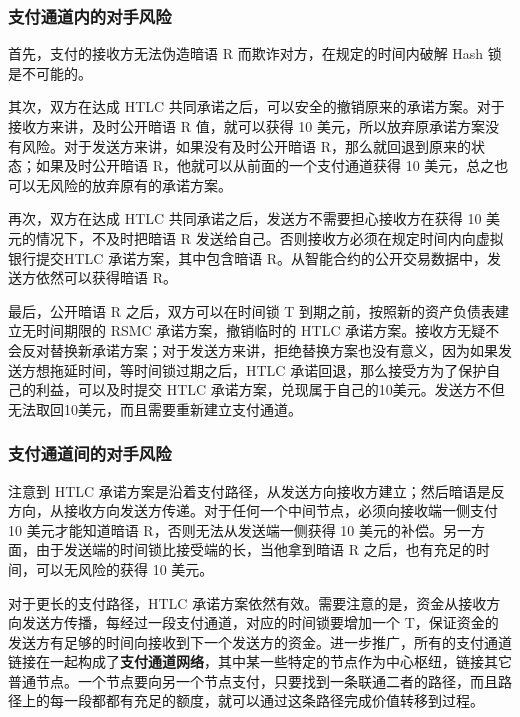 \subsubsection{支付通道内的对手风险}
首先，支付的接收方无法伪造暗语 R 而欺诈对方，在规定的时间内破解 Hash 锁是不可能的。

其次，双方在达成 HTLC 共同承诺之后，可以安全的撤销原来的承诺方案。对于接收方来讲，及时公开暗语 R 值，就可以获得 10 美元，所以放弃原承诺方案没有风险。对于发送方来讲，如果没有及时公开暗语 R，那么就回退到原来的状态；如果及时公开暗语 R，他就可以从前面的一个支付通道获得 10 美元，总之也可以无风险的放弃原有的承诺方案。

再次，双方在达成 HTLC 共同承诺之后，发送方不需要担心接收方在获得 10 美元的情况下，不及时把暗语 R 发送给自己。否则接收方必须在规定时间内向虚拟银行提交HTLC 承诺方案，其中包含暗语 R。从智能合约的公开交易数据中，发送方依然可以获得暗语 R。

最后，公开暗语 R 之后，双方可以在时间锁 T 到期之前，按照新的资产负债表建立无时间期限的 RSMC 承诺方案，撤销临时的 HTLC 承诺方案。接收方无疑不会反对替换新承诺方案；对于发送方来讲，拒绝替换方案也没有意义，因为如果发送方想拖延时间，等时间锁过期之后，HTLC 承诺回退，那么接受方为了保护自己的利益，可以及时提交 HTLC 承诺方案，兑现属于自己的10美元。发送方不但无法取回10美元，而且需要重新建立支付通道。

\subsubsection{支付通道间的对手风险}

注意到 HTLC 承诺方案是沿着支付路径，从发送方向接收方建立；然后暗语是反方向，从接收方向发送方传递。对于任何一个中间节点，必须向接收端一侧支付 10 美元才能知道暗语 R，否则无法从发送端一侧获得 10 美元的补偿。另一方面，由于发送端的时间锁比接受端的长，当他拿到暗语 R 之后，也有充足的时间，可以无风险的获得 10 美元。

对于更长的支付路径，HTLC 承诺方案依然有效。需要注意的是，资金从接收方向发送方传播，每经过一段支付通道，对应的时间锁要增加一个 T，保证资金的发送方有足够的时间向接收到下一个发送方的资金。进一步推广，所有的支付通道链接在一起构成了\textbf{支付通道网络}，其中某一些特定的节点作为中心枢纽，链接其它普通节点。一个节点要向另一个节点支付，只要找到一条联通二者的路径，而且路径上的每一段都都有充足的额度，就可以通过这条路径完成价值转移到过程。



